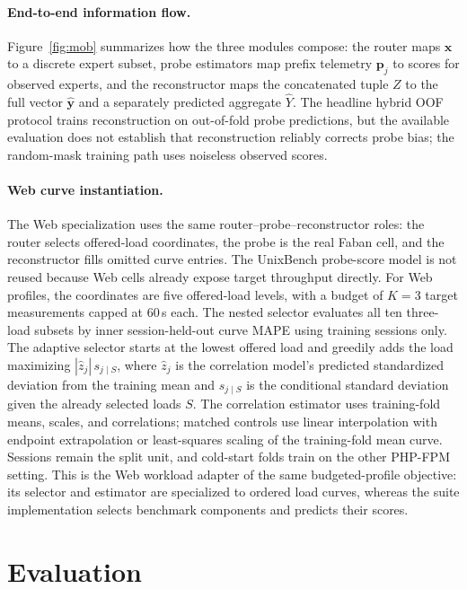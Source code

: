 \documentclass[sigconf, review, anonymous, balance=false]{acmart}
\begin{document}
\paragraph{End-to-end information flow.}
Figure~\ref{fig:mob} summarizes how the three modules compose: the router maps $\mathbf{x}$ to a discrete expert subset, probe estimators map prefix telemetry $\mathbf{p}_j$ to scores for observed experts, and the reconstructor maps the concatenated tuple $Z$ to the full vector $\hat{\mathbf{y}}$ and a separately predicted aggregate $\hat{Y}$.
The headline hybrid OOF protocol trains reconstruction on out-of-fold probe predictions, but the available evaluation does not establish that reconstruction reliably corrects probe bias; the random-mask training path uses noiseless observed scores.

\paragraph{Web curve instantiation.}
The Web specialization uses the same router--probe--reconstructor roles: the router selects offered-load coordinates, the probe is the real Faban cell, and the reconstructor fills omitted curve entries. The UnixBench probe-score model is not reused because Web cells already expose target throughput directly.
For Web profiles, the coordinates are five offered-load levels, with a budget of $K=3$ target measurements capped at 60\,s each. The nested selector evaluates all ten three-load subsets by inner session-held-out curve MAPE using training sessions only. The adaptive selector starts at the lowest offered load and greedily adds the load maximizing $|\hat{z}_j|\,s_{j\mid S}$, where $\hat{z}_j$ is the correlation model's predicted standardized deviation from the training mean and $s_{j\mid S}$ is the conditional standard deviation given the already selected loads $S$. The correlation estimator uses training-fold means, scales, and correlations; matched controls use linear interpolation with endpoint extrapolation or least-squares scaling of the training-fold mean curve. Sessions remain the split unit, and cold-start folds train on the other PHP-FPM setting. This is the Web workload adapter of the same budgeted-profile objective: its selector and estimator are specialized to ordered load curves, whereas the suite implementation selects benchmark components and predicts their scores.


\section{Evaluation}
\label{sec:evaluation}
\end{document}
